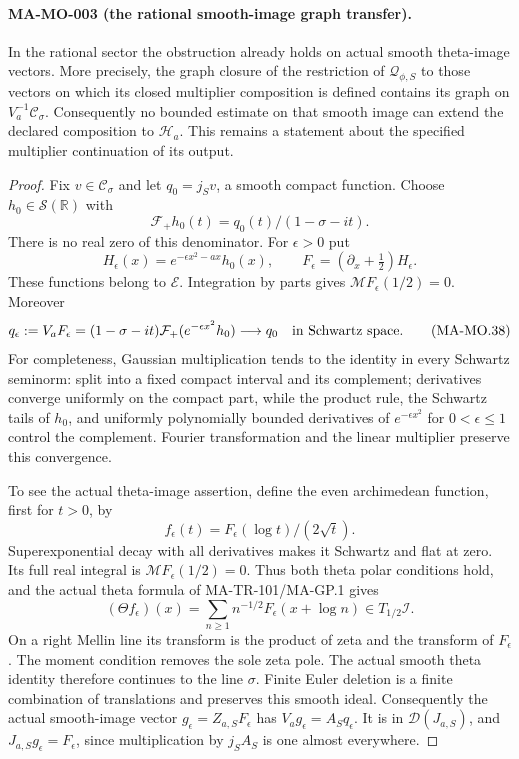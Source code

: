 \paragraph{MA-MO-003 (the rational smooth-image graph transfer).}
In the rational sector the obstruction already holds
on actual smooth theta-image vectors. More precisely,
the graph closure of the restriction of
\(\mathcal Q_{\phi,S}\) to those vectors on which its
closed multiplier composition is defined contains
its graph on \(V_a^{-1}\mathscr C_\sigma\).
Consequently no bounded estimate on that smooth image
can extend the declared composition to \(\mathcal H_a\).
This remains a statement about the specified multiplier
continuation of its output.

\begin{proof}
Fix \(v\in\mathscr C_\sigma\) and let \(q_0=j_Sv\),
a smooth compact function. Choose \(h_0\in\mathscr S(\mathbb R)\)
with
\[
          \mathcal F_+h_0(t)=q_0(t)/(1-\sigma-it).
 \tag{MA-MO.36}
\]
There is no real zero of this denominator.
For \(\epsilon>0\) put
\[
 H_\epsilon(x)=e^{-\epsilon x^2-ax}h_0(x),\qquad
 F_\epsilon=(\partial_x+\tfrac12)H_\epsilon .
 \tag{MA-MO.37}
\]
These functions belong to \(\mathcal E\).
Integration by parts gives
\(\mathcal M F_\epsilon(1/2)=0\).
Moreover
\[
 q_\epsilon:=V_aF_\epsilon
       =(1-\sigma-it)\mathcal F_+(e^{-\epsilon x^2}h_0)
                           \longrightarrow q_0
                               \quad\hbox{in Schwartz space}.
 \tag{MA-MO.38}
\]
For completeness, Gaussian multiplication tends to the
identity in every Schwartz seminorm: split into a fixed
compact interval and its complement; derivatives converge
uniformly on the compact part, while the product rule,
the Schwartz tails of \(h_0\), and uniformly polynomially
bounded derivatives of \(e^{-\epsilon x^2}\) for
\(0<\epsilon\le1\) control the complement.
Fourier transformation and the linear multiplier preserve
this convergence.

To see the actual theta-image assertion, define the even
archimedean function, first for \(t>0\), by
\[
                   f_\epsilon(t)=
                    F_\epsilon(\log t)/(2\sqrt t).
 \tag{MA-MO.39}
\]
Superexponential decay with all derivatives makes it
Schwartz and flat at zero. Its full real integral is
\(\mathcal M F_\epsilon(1/2)=0\).
Thus both theta polar conditions hold, and the actual
theta formula of MA-TR-101/MA-GP.1 gives
\[
 (\Theta f_\epsilon)(x)
       =\sum_{n\ge1}n^{-1/2}F_\epsilon(x+\log n)
                       \in T_{1/2}\mathcal I .
 \tag{MA-MO.40}
\]
On a right Mellin line its transform is the product
of zeta and the transform of \(F_\epsilon\).
The moment condition removes the sole zeta pole.
The actual smooth theta identity therefore continues
to the line \(\sigma\).
Finite Euler deletion is a finite combination of
translations and preserves this smooth ideal.
Consequently the actual smooth-image vector
\(g_\epsilon=Z_{a,S}F_\epsilon\) has
\(V_ag_\epsilon=A_Sq_\epsilon\).
It is in \(\mathcal D(J_{a,S})\), and
\(J_{a,S}g_\epsilon=F_\epsilon\), since multiplication
by \(j_S A_S\) is one almost everywhere.


\end{proof}
